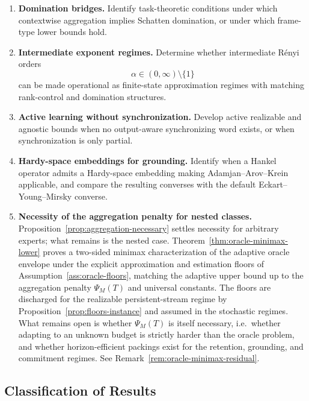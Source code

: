 \documentclass[12pt]{article}
\theoremstyle{definition}
\newcommand{\PsiAgg}{\Psi}
\begin{document}
\begin{enumerate}[leftmargin=2.0em]
\item \textbf{Domination bridges.}
Identify task-theoretic conditions under which contextwise aggregation
implies Schatten domination, or under which frame-type lower bounds hold.

\item \textbf{Intermediate exponent regimes.}
Determine whether intermediate R\'enyi orders
\[
\alpha\in(0,\infty)\setminus\{1\}
\]
can be made operational as finite-state approximation regimes with matching
rank-control and domination structures.

\item \textbf{Active learning without synchronization.}
Develop active realizable and agnostic bounds when no output-aware
synchronizing word exists, or when synchronization is only partial.

\item \textbf{Hardy-space embeddings for grounding.}
Identify when a Hankel operator admits a Hardy-space embedding making
Adamjan--Arov--Krein applicable, and compare the resulting converses with
the default Eckart--Young--Mirsky converse.

\item \textbf{Necessity of the aggregation penalty for nested classes.}
Proposition~\ref{prop:aggregation-necessary} settles necessity for arbitrary
experts; what remains is the nested case.
Theorem~\ref{thm:oracle-minimax-lower} proves a two-sided minimax
characterization of the adaptive oracle envelope under the explicit
approximation and estimation floors of
Assumption~\ref{ass:oracle-floors}, matching the adaptive upper bound up to
the aggregation penalty $\PsiAgg_M(T)$ and universal constants.  The floors are
discharged for the realizable persistent-stream regime by
Proposition~\ref{prop:floors-instance} and assumed in the stochastic regimes.
What remains open is whether $\PsiAgg_M(T)$ is itself necessary, i.e.\ whether
adapting to an unknown budget is strictly harder than the oracle problem, and
whether horizon-efficient packings exist for the retention, grounding, and
commitment regimes.  See Remark~\ref{rem:oracle-minimax-residual}.
\end{enumerate}

\subsection{Classification of Results}
\label{subsec:final-epistemic}
\end{document}
